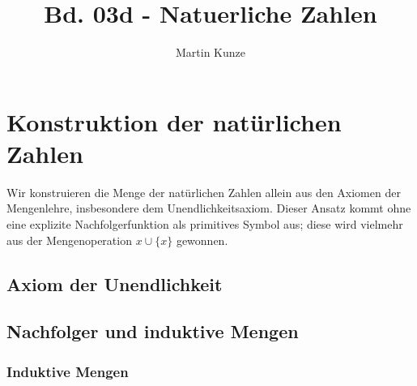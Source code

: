 \documentclass[main.tex]{subfiles}
\title{Bd. 03d - Natuerliche Zahlen}
\author{Martin Kunze}
\date{}
\begin{document}
\ifSubfilesClassLoaded{
  \ifdefined\BThreeSuppressPartFrontmatter
  \else
    \maketitle
    \setcounter{tocdepth}{3}
    \tableofcontents
  \fi
}{}
\setcounter{file}{3}
\renewcommand{\FormulaBandID}{3}
\setcounter{chapter}{18}

\chapter{Konstruktion der natürlichen Zahlen}

Wir konstruieren die Menge der natürlichen Zahlen allein aus den Axiomen der Mengenlehre, insbesondere dem Unendlichkeitsaxiom.  Dieser Ansatz kommt ohne eine explizite Nachfolgerfunktion als primitives Symbol aus; diese wird vielmehr aus der Mengenoperation \(x \cup \{x\}\) gewonnen.

\section{Axiom der Unendlichkeit}




\section{Nachfolger und induktive Mengen}

\subsection{Induktive Mengen}


\begin{tabproof}
\end{tabproof}
\end{document}
